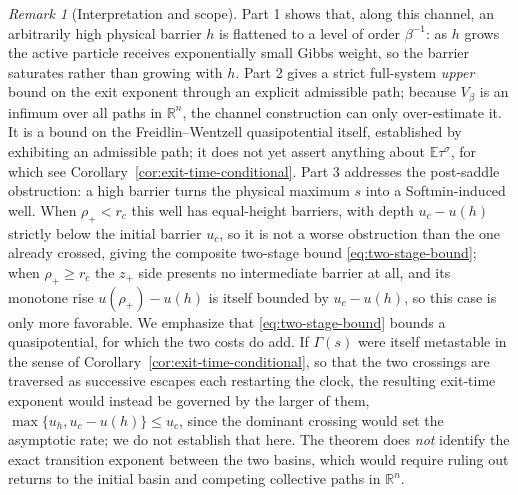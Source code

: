 \documentclass{article} %
\theoremstyle{plain}
\theoremstyle{definition}
\theoremstyle{remark}
\newtheorem{remark}[theorem]{Remark}
\newcommand{\R}{\mathbb{R}}
\newcommand{\E}{\mathbb{E}}
\begin{document}
\begin{remark}[Interpretation and scope]
\label{rem:scope}
Part 1 shows that, along this channel, an arbitrarily high physical barrier $h$ is flattened to a level of order $\beta^{-1}$: as $h$ grows the active particle receives exponentially small Gibbs weight, so the barrier saturates rather than growing with $h$. Part 2 gives a strict full-system \emph{upper} bound on the exit exponent through an explicit admissible path; because $V_\beta$ is an infimum over all paths in $\R^n$, the channel construction can only over-estimate it. It is a bound on the Freidlin--Wentzell quasipotential itself, established by exhibiting an admissible path; it does not yet assert anything about $\E\tau^\sigma$, for which see Corollary~\ref{cor:exit-time-conditional}. Part 3 addresses the post-saddle obstruction: a high barrier turns the physical maximum $s$ into a Softmin-induced well. When $\rho_+<r_c$ this well has equal-height barriers, with depth $u_c-u(h)$ strictly below the initial barrier $u_c$, so it is not a worse obstruction than the one already crossed, giving the composite two-stage bound \eqref{eq:two-stage-bound}; when $\rho_+\ge r_c$ the $z_+$ side presents no intermediate barrier at all, and its monotone rise $u(\rho_+)-u(h)$ is itself bounded by $u_c-u(h)$, so this case is only more favorable. We emphasize that \eqref{eq:two-stage-bound} bounds a quasipotential, for which the two costs do add. If $\Gamma(s)$ were itself metastable in the sense of Corollary~\ref{cor:exit-time-conditional}, so that the two crossings are traversed as successive escapes each restarting the clock, the resulting exit-time exponent would instead be governed by the larger of them, $\max\{u_h,u_c-u(h)\}\le u_c$, since the dominant crossing would set the asymptotic rate; we do not establish that here. The theorem does \emph{not} identify the exact transition exponent between the two basins, which would require ruling out returns to the initial basin and competing collective paths in $\R^n$.
\end{remark}
\end{document}
